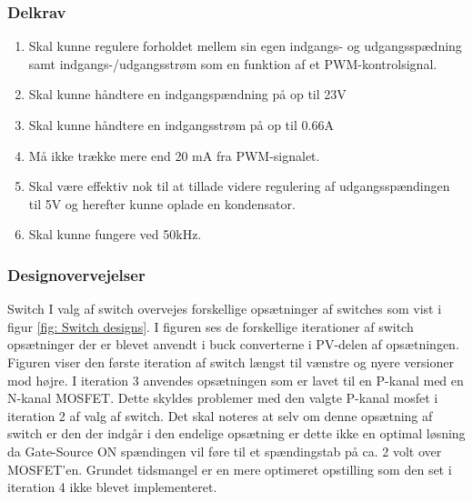 \documentclass[../main.tex]{subfiles}
\begin{document}
        \subsubsection{Delkrav}

            \begin{enumerate}
                \item Skal kunne regulere forholdet mellem sin egen indgangs- og udgangsspædning samt indgangs-/udgangsstrøm som en funktion af et PWM-kontrolsignal.
                \item Skal kunne håndtere en indgangspændning på op til 23V
                \item Skal kunne håndtere en indgangsstrøm på op til 0.66A
                \item Må ikke trække mere end 20 mA fra PWM-signalet.
                \item Skal være effektiv nok til at tillade videre regulering af udgangsspændingen til 5V og herefter kunne oplade en kondensator.
                \item Skal kunne fungere ved 50kHz.
            \end{enumerate}
            
        \subsubsection{Designovervejelser}
            
            
            Switch
            I valg af switch overvejes forskellige opsætninger af switches som vist i figur \ref{fig: Switch designs}. I figuren ses de forskellige iterationer af switch opsætninger der er blevet anvendt i buck converterne i PV-delen af opsætningen. Figuren viser den første iteration af switch længst til vænstre og nyere versioner mod højre.
            \newline
            I iteration 3 anvendes opsætningen som er lavet til en P-kanal med en N-kanal MOSFET. Dette skyldes problemer med den valgte P-kanal mosfet i iteration 2 af valg af switch. Det skal noteres at selv om denne opsætning af switch er den der indgår i den endelige opsætning er dette ikke en optimal løsning da Gate-Source ON spændingen vil føre til et spændingstab på ca. 2 volt over MOSFET'en. Grundet tidsmangel er en mere optimeret opstilling som den set i iteration 4 ikke blevet implementeret.\newline
            
\end{document}
